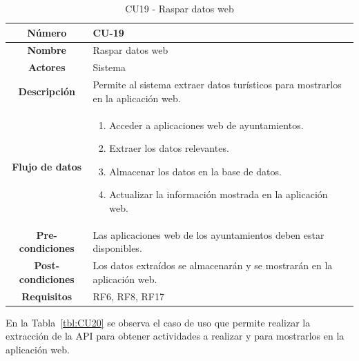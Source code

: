 \begin{table}[h!tb]
	\centering
	\begin{adjustbox}{width=1\textwidth}
	\begin{tabular}{|c|p{\textwidth}|}
		\hline {\bf Número} & CU-19 \\
		\hline {\bf Nombre} & Raspar datos web\\
		\hline {\bf Actores} & Sistema \\ 
		\hline {\bf Descripción} & Permite al sistema extraer datos turísticos para mostrarlos en la aplicación web. \\ 
		\hline {\bf Flujo de datos}
		& 
		\begin{enumerate}
			\item Acceder a aplicaciones web de ayuntamientos.
			\item Extraer los datos relevantes.
			\item Almacenar los datos en la base de datos.
			\item Actualizar la información mostrada en la aplicación web.
		\end{enumerate}\\
		\hline {\bf Pre-condiciones}
		& Las aplicaciones web de los ayuntamientos deben estar disponibles. \\ 
		\hline {\bf Post-condiciones}
		& Los datos extraídos se almacenarán y se mostrarán en la aplicación web. \\ 
		\hline {\bf Requisitos} & RF6, RF8, RF17 \\ 
		\hline 
	\end{tabular}
	\end{adjustbox}
	\caption{CU19 - Raspar datos web\label{tbl:CU19}}
\end{table}
En la Tabla~\ref{tbl:CU20} se observa el caso de uso que permite realizar la extracción de la API para obtener actividades a realizar y para mostrarlos en la aplicación web.
